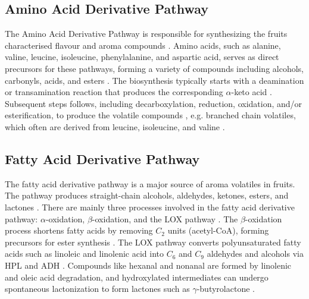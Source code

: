\subsection{Amino Acid Derivative Pathway}
The Amino Acid Derivative Pathway is responsible for synthesizing the fruits characterised flavour and aroma compounds \cite*{A13_ElHadi2013}. Amino acids, such as alanine, valine, leucine, isoleucine, phenylalanine, and aspartic acid, serves as direct precursors for these pathways, forming a variety of compounds including alcohols, carbonyls, acids, and esters \cite*{A13_ElHadi2013}. The biosynthesis typically starts with a deamination or transamination reaction that produces the corresponding $\alpha$-keto acid \cite*{A13_ElHadi2013}. Subsequent steps follows, including decarboxylation, reduction, oxidation, and/or esterification, to produce the volatile compounds \cite*{A13_ElHadi2013}, e.g. branched chain volatiles, which often are derived from leucine, isoleucine, and valine \cite*{A05_Chin2019}.


\subsection{Fatty Acid Derivative Pathway}
The fatty acid derivative pathway is a major source of aroma volatiles in fruits. The pathway produces straight-chain alcohols, aldehydes, ketones, esters, and lactones \cite*{A13_ElHadi2013}. There are mainly three processes involved in the fatty acid derivative pathway: $\alpha$-oxidation, $\beta$-oxidation, and the LOX pathway \cite*{A13_ElHadi2013,A16_Tandel2023}. The $\beta$-oxidation process shortens fatty acids by removing $C_2$ units (acetyl-CoA), forming precursors for ester synthesis \cite*{A13_ElHadi2013}. The LOX pathway converts polyunsaturated fatty acids such as linoleic and linolenic acid into $C_6$ and $C_9$ aldehydes and alcohols via HPL and ADH \cite*{A13_ElHadi2013}. Compounds like hexanal and nonanal are formed by linolenic and oleic acid degradation, and hydroxylated intermediates can undergo spontaneous lactonization to form lactones such as $\gamma$-butyrolactone \cite*{A07_Bonneau2016,A14_Silva2021}.


